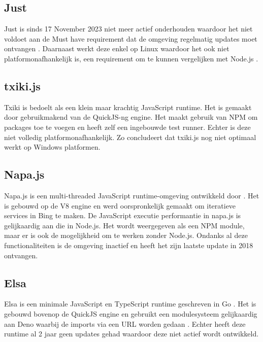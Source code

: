 \subsection{Just}
Just is sinds 17 November 2023 niet meer actief onderhouden waardoor het niet voldoet aan de Must 
have requirement dat de omgeving regelmatig updates moet ontvangen \autocite{Johnston2023}.
Daarnaast werkt deze enkel op Linux waardoor het ook niet platformonafhankelijk is, 
een requirement om te kunnen vergelijken met Node.js \autocite{Johnston2023}.

\subsection{txiki.js}
Txiki is bedoelt als een klein maar krachtig JavaScript runtime. 
Het is gemaakt door \textcite{Corretge2024} gebruikmakend van de QuickJS-ng engine. 
Het maakt gebruik van NPM om packages toe te voegen en heeft zelf een ingebouwde test runner. 
Echter is deze niet volledig platformonafhankelijk. 
Zo concludeert \textcite{Corretge2024} dat txiki.js nog niet optimaal werkt op Windows platformen.

\subsection{Napa.js}
Napa.js is een multi-threaded JavaScript runtime-omgeving ontwikkeld door \textcite{Microsoft2018}. 
Het is gebouwd op de V8 engine en werd oorspronkelijk gemaakt om iteratieve services in Bing te maken.
De JavaScript executie performantie in napa.js is gelijkaardig aan die in Node.js. 
Het wordt weergegeven als een NPM module, maar er is ook de mogelijkheid om te werken zonder Node.js.
Ondanks al deze functionaliteiten is de omgeving inactief en heeft het zijn laatste update in 2018 ontvangen.

\subsection{Elsa}
Elsa is een minimale JavaScript en TypeScript runtime geschreven in Go \autocite{Garcia2022}. 
Het is gebouwd bovenop de QuickJS engine en gebruikt een modulesysteem gelijkaardig aan Deno waarbij de imports via een URL worden gedaan \autocite{Garcia2022}.
Echter heeft deze runtime al 2 jaar geen updates gehad waardoor deze niet actief wordt ontwikkeld.

